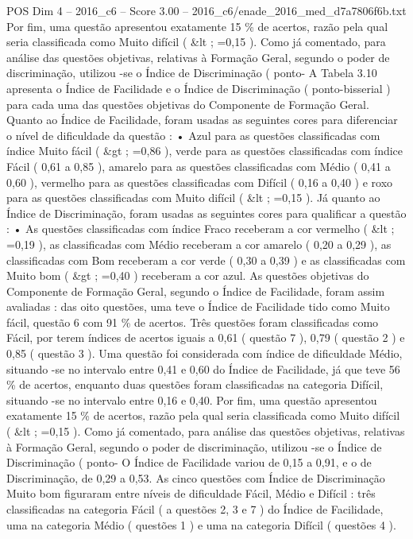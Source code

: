 \begin{textsample}{POS Dim 4 – 2016\_c6 – Score 3.00 – 2016\_c6/enade\_2016\_med\_d7a7806f6b.txt}
Por fim, uma questão apresentou exatamente 15 \% de acertos, razão pela qual seria classificada como Muito difícil ( \&lt ; =0,15 ).
Como já comentado, para análise das questões objetivas, relativas à Formação Geral, segundo o poder de discriminação, utilizou -se o Índice de Discriminação ( ponto- A Tabela 3.10 apresenta o Índice de Facilidade e o Índice de Discriminação ( ponto-bisserial ) para cada uma das questões objetivas do Componente de Formação Geral.
Quanto ao Índice de Facilidade, foram usadas as seguintes cores para diferenciar o nível de dificuldade da questão : • Azul para as questões classificadas com índice Muito fácil ( \&gt ; =0,86 ), verde para as questões classificadas com índice Fácil ( 0,61 a 0,85 ), amarelo para as questões classificadas com Médio ( 0,41 a 0,60 ), vermelho para as questões classificadas com Difícil ( 0,16 a 0,40 ) e roxo para as questões classificadas com Muito difícil ( \&lt ; =0,15 ).
Já quanto ao Índice de Discriminação, foram usadas as seguintes cores para qualificar a questão : • As questões classificadas com índice Fraco receberam a cor vermelho ( \&lt ; =0,19 ), as classificadas com Médio receberam a cor amarelo ( 0,20 a 0,29 ), as classificadas com Bom receberam a cor verde ( 0,30 a 0,39 ) e as classificadas com Muito bom ( \&gt ; =0,40 ) receberam a cor azul.
As questões objetivas do Componente de Formação Geral, segundo o Índice de Facilidade, foram assim avaliadas : das oito questões, uma teve o Índice de Facilidade tido como Muito fácil, questão 6 com 91 \% de acertos.
Três questões foram classificadas como Fácil, por terem índices de acertos iguais a 0,61 ( questão 7 ), 0,79 ( questão 2 ) e 0,85 ( questão 3 ).
Uma questão foi considerada com índice de dificuldade Médio, situando -se no intervalo entre 0,41 e 0,60 do Índice de Facilidade, já que teve 56 \% de acertos, enquanto duas questões foram classificadas na categoria Difícil, situando -se no intervalo entre 0,16 e 0,40.
Por fim, uma questão apresentou exatamente 15 \% de acertos, razão pela qual seria classificada como Muito difícil ( \&lt ; =0,15 ).
Como já comentado, para análise das questões objetivas, relativas à Formação Geral, segundo o poder de discriminação, utilizou -se o Índice de Discriminação ( ponto- O Índice de Facilidade variou de 0,15 a 0,91, e o de Discriminação, de 0,29 a 0,53.
As cinco questões com Índice de Discriminação Muito bom figuraram entre níveis de dificuldade Fácil, Médio e Difícil : três classificadas na categoria Fácil ( a questões 2, 3 e 7 ) do Índice de Facilidade, uma na categoria Médio ( questões 1 ) e uma na categoria Difícil ( questões 4 ).

\end{textsample}
